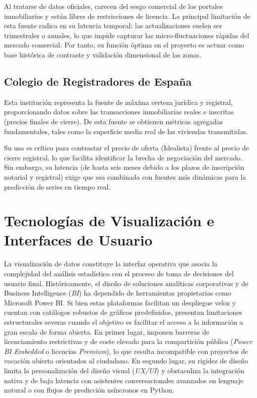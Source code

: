 \documentclass[a4paper,11pt,openany]{book}
\begin{document}
Al tratarse de datos oficiales, carecen del sesgo comercial de los portales inmobiliarios y están libres de restricciones de licencia. La principal limitación de esta fuente radica en su latencia temporal: las actualizaciones suelen ser trimestrales o anuales, lo que impide capturar las micro-fluctuaciones rápidas del mercado comercial. Por tanto, su función óptima en el proyecto es actuar como base histórica de contraste y validación dimensional de las zonas.

\subsection{Colegio de Registradores de España}
Esta institución representa la fuente de máxima certeza jurídica y registral, proporcionando datos sobre las transacciones inmobiliarias reales e inscritas (precios finales de cierre). De esta fuente se obtienen métricas agregadas fundamentales, tales como la superficie media real de las viviendas transmitidas.

Su uso es crítico para contrastar el precio de oferta (Idealista) frente al precio de cierre registral, lo que facilita identificar la brecha de negociación del mercado. Sin embargo, su latencia (de hasta seis meses debido a los plazos de inscripción notarial y registral) exige que sea combinada con fuentes más dinámicas para la predicción de series en tiempo real.

\section{Tecnologías de Visualización e Interfaces de Usuario}
La visualización de datos constituye la interfaz operativa que asocia la complejidad del análisis estadístico con el proceso de toma de decisiones del usuario final. Históricamente, el diseño de soluciones analíticas corporativas y de Business Intelligence (\textit{BI}) ha dependido de herramientas propietarias como Microsoft Power BI. Si bien estas plataformas facilitan un despliegue veloz y cuentan con catálogos robustos de gráficos predefinidos, presentan limitaciones estructurales severas cuando el objetivo es facilitar el acceso a la información a gran escala de forma abierta. En primer lugar, imponen barreras de licenciamiento restrictivas y de coste elevado para la compartición pública (\textit{Power BI Embedded} o licencias \textit{Premium}), lo que resulta incompatible con proyectos de vocación abierta orientados al ciudadano. En segundo lugar, su rigidez de diseño limita la personalización del diseño visual (\textit{UX/UI}) y obstaculiza la integración nativa y de baja latencia con asistentes conversacionales avanzados en lenguaje natural o con flujos de predicción asíncronos en Python.
\end{document}
